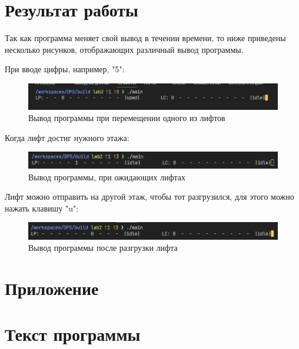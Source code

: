 \newpage

\section*{Результат работы}

Так как программа меняет свой вывод в течении времени, то ниже приведены
несколько рисунков, отображающих различный вывод программы.

При вводе цифры, например, "5":

\begin{figure}[H]
    \centering
    \includegraphics[width=0.8\linewidth]{images/lab2_output1.png}
    \caption{Вывод программы при перемещении одного из лифтов}
    \label{fig:output1}
\end{figure}

Когда лифт достиг нужного этажа:

\begin{figure}[H]
    \centering
    \includegraphics[width=0.8\linewidth]{images/lab2_output2.png}
    \caption{Вывод программы, при ожидающих лифтах}
    \label{fig:output2}
\end{figure}

Лифт можно отправить на другой этаж, чтобы тот разгрузился, для этого можно
нажать клавишу "u":

\begin{figure}[H]
    \centering
    \includegraphics[width=0.8\linewidth]{images/lab2_output3.png}
    \caption{Вывод программы после разгрузки лифта}
    \label{fig:output3}
\end{figure}

\newpage

\appendix

\section*{Приложение}
\section*{Текст программы}


